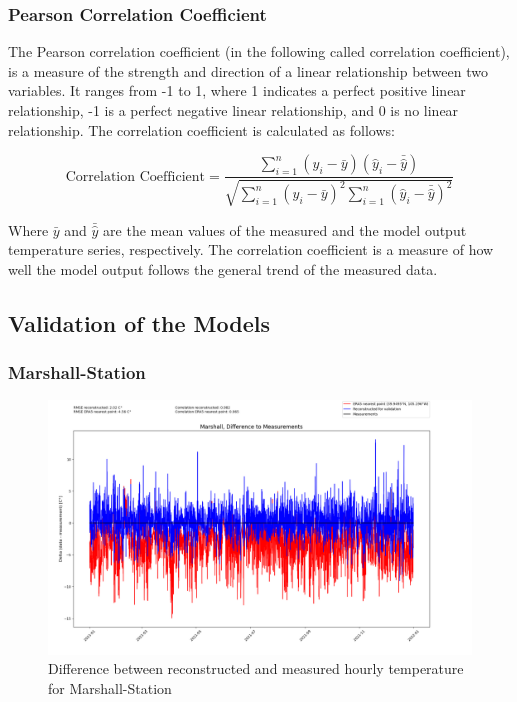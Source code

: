 \subsubsection*{Pearson Correlation Coefficient}

The Pearson correlation coefficient (in the following called correlation coefficient), is a measure of the strength and direction of a linear relationship between two variables. It ranges from -1 to 1, where 1 indicates a perfect positive linear relationship, -1 is a perfect negative linear relationship, and 0 is no linear relationship. The correlation coefficient is calculated as follows:

\begin{equation}
    \text{Correlation Coefficient} = \frac{\sum_{i=1}^{n} (y_i - \bar{y})(\hat{y}_i - \bar{\hat{y}})}{\sqrt{\sum_{i=1}^{n} (y_i - \bar{y})^2 \sum_{i=1}^{n} (\hat{y}_i - \bar{\hat{y}})^2}}
    \label{eq: correlation}
\end{equation}
    
Where $\bar{y}$ and $\bar{\hat{y}}$ are the mean values of the measured and the model output temperature series, respectively. The correlation coefficient is a measure of how well the model output follows the general trend of the measured data. \cite{Zou2003Correlation}

\subsection{Validation of the Models}

\subsubsection*{Marshall-Station}

\begin{figure}
    \centering
    \includegraphics[width=1.02\textwidth]{resources/images/charts/marshall_eval_grib_final/Marshall, Difference to Measurements.png}
    \caption{Difference between reconstructed and measured hourly temperature for Marshall-Station}
    \label{fig: marshall_diff}
\end{figure}

